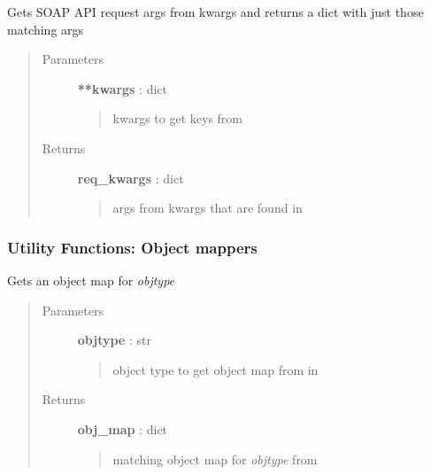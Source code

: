 \documentclass[letterpaper,10pt,english]{sphinxmanual}
\begin{document}

\begin{fulllineitems}
\label{pytan.utils:pytan.utils.get_req_kwargs}
Gets SOAP API request args from kwargs and returns a dict with just those matching args
\begin{quote}\begin{description}
\item[{Parameters}] \leavevmode
\textbf{**kwargs} : dict
\begin{quote}

kwargs to get keys from
\end{quote}

\item[{Returns}] \leavevmode
\textbf{req\_kwargs} : dict
\begin{quote}

args from kwargs that are found in {\hyperref[pytan.constants:pytan.constants.REQ_KWARGS]{}}
\end{quote}

\end{description}\end{quote}

\end{fulllineitems}



\subsubsection{Utility Functions: Object mappers}
\label{pytan.utils:utility-functions-object-mappers}

\begin{fulllineitems}
\label{pytan.utils:pytan.utils.get_obj_map}
Gets an object map for \emph{objtype}
\begin{quote}\begin{description}
\item[{Parameters}] \leavevmode
\textbf{objtype} : str
\begin{quote}

object type to get object map from in {\hyperref[pytan.constants:pytan.constants.GET_OBJ_MAP]{}}
\end{quote}

\item[{Returns}] \leavevmode
\textbf{obj\_map} : dict
\begin{quote}

matching object map for \emph{objtype} from {\hyperref[pytan.constants:pytan.constants.GET_OBJ_MAP]{}}
\end{quote}

\end{description}\end{quote}

\end{fulllineitems}
\end{document}
